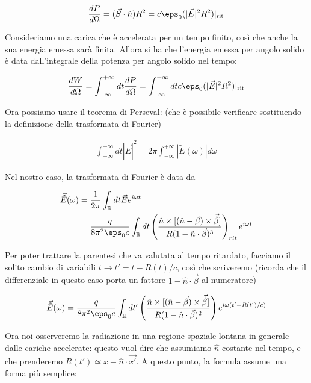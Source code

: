 \documentclass{report}
\begin{document}
\begin{align}
    \frac{dP}{d\Omega} = (\vec{S}\cdot \hat{n})R^2 = c\eps_0 (|\vec{E}|^2R^2)|_{\text{rit}}
\end{align}

Consideriamo una carica che è accelerata per un tempo finito, così che anche la sua energia emessa sarà finita. Allora si ha che l'energia emessa per angolo solido è data dall'integrale della potenza per angolo solido nel tempo: 

\begin{align}
    \frac{dW}{d\Omega} = \int_{-\infty}^{+\infty} dt \frac{dP}{d\Omega} = \int_{-\infty}^{+\infty} dt c\eps_0 (|\vec{E}|^2R^2)|_{\text{rit}}
\end{align}

Ora possiamo usare il teorema di Perseval: (che è possibile verificare sostituendo la definizione della trasformata di Fourier)

\begin{align}
    \int_{-\infty}^{+\infty} dt |\vec{E}|^2 = 2\pi \int_{-\infty}^{+\infty} |\tilde{E}(\omega)|d\omega 
\end{align}

Nel nostro caso, la trasformata di Fourier è data da  

\begin{align}
    \vec{\tilde{E}}(\omega) &= \frac{1}{2\pi}\int_{\mathbb{R}} dt \vec{E}e^{i\omega t} \\
    &= \frac{q}{8\pi^2\eps_0 c}\int_{\mathbb{R}} dt \left(\frac{\hat{n} \times [(\hat{n}-\vec{\beta})\times \vec{\dot{\beta}}]}{R(1-\hat{n}\cdot \vec{\beta})^3}\right)_{rit} e^{i\omega t}
\end{align}

Per poter trattare la parentesi che va valutata al tempo ritardato, facciamo il solito cambio di variabili \(t \rightarrow t' = t - R(t)/c\), così che scriveremo (ricorda che il differenziale in questo caso porta un fattore \(1-\hat{n}\cdot \vec{\beta}\) al numeratore)

\begin{align}
    \vec{\tilde{E}}(\omega) = \frac{q}{8\pi^2\eps_0 c}\int_{\mathbb{R}} dt' \left(\frac{\hat{n} \times [(\hat{n}-\vec{\beta})\times \vec{\dot{\beta}}]}{R(1-\hat{n}\cdot \vec{\beta})^2}\right) e^{i\omega(t' + R(t')/c)}
\end{align}


Ora noi osserveremo la radiazione in una regione spaziale lontana in generale dalle cariche accelerate: questo vuol dire che assumiamo \(\hat{n}\) costante nel tempo, e che prenderemo \(R(t') \simeq x - \hat{n}\cdot \vec{x'}\). A questo punto, la formula assume una forma più semplice: 
\end{document}
